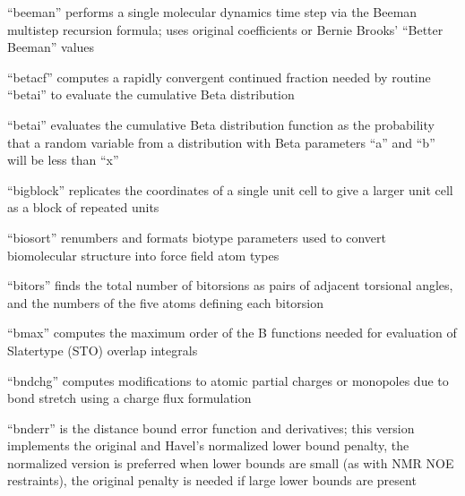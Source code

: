 \documentclass[letterpaper,11pt,english]{sphinxmanual}
\begin{document}
\sphinxAtStartPar
{}

\sphinxAtStartPar
“beeman” performs a single molecular dynamics time step via the Beeman multistep recursion formula; uses original coefficients or Bernie Brooks’ “Better Beeman” values

\sphinxAtStartPar
{}

\sphinxAtStartPar
“betacf” computes a rapidly convergent continued fraction needed by routine “betai” to evaluate the cumulative Beta distribution

\sphinxAtStartPar
{}

\sphinxAtStartPar
“betai” evaluates the cumulative Beta distribution function as the probability that a random variable from a distribution with Beta parameters “a” and “b” will be less than “x”

\sphinxAtStartPar
{}

\sphinxAtStartPar
“bigblock” replicates the coordinates of a single unit cell to give a larger unit cell as a block of repeated units

\sphinxAtStartPar
{}

\sphinxAtStartPar
“biosort” renumbers and formats biotype parameters used to convert biomolecular structure into force field atom types

\sphinxAtStartPar
{}

\sphinxAtStartPar
“bitors” finds the total number of bitorsions as pairs of adjacent torsional angles, and the numbers of the five atoms defining each bitorsion

\sphinxAtStartPar
{}

\sphinxAtStartPar
“bmax” computes the maximum order of the B functions needed for evaluation of Slater\sphinxhyphen{}type (STO) overlap integrals

\sphinxAtStartPar
{}

\sphinxAtStartPar
“bndchg” computes modifications to atomic partial charges or monopoles due to bond stretch using a charge flux formulation

\sphinxAtStartPar
{}

\sphinxAtStartPar
“bnderr” is the distance bound error function and derivatives; this version implements the original and Havel’s normalized lower bound penalty, the normalized version is preferred when lower bounds are small (as with NMR NOE restraints), the original penalty is needed if large lower bounds are present
\end{document}
